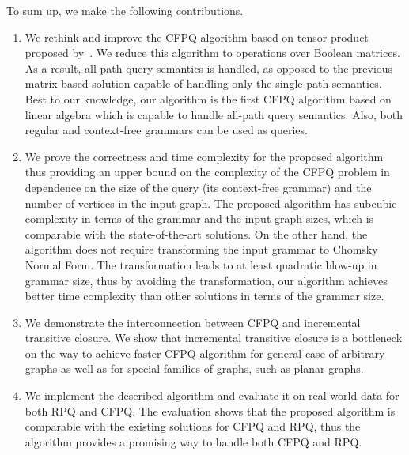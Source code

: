 To sum up, we make the following contributions.
\begin{enumerate}
	\item We rethink and improve the CFPQ algorithm based on tensor-product proposed by~\cite{10.1007/978-3-030-54832-2_6}.
	We reduce this algorithm to operations over Boolean matrices.
	As a result, all-path query semantics is handled, as opposed to the previous matrix-based solution capable of handling only the single-path semantics.
	Best to our knowledge, our algorithm is the first CFPQ algorithm based on linear algebra which is capable to handle all-path query semantics.
	Also, both regular and context-free grammars can be used as queries.
	\item
	We prove the correctness and time complexity for the proposed algorithm thus providing an upper bound on the complexity of the CFPQ problem in dependence on the size of the query (its context-free grammar) and the number of vertices in the input graph.
	The proposed algorithm has subcubic complexity in terms of the grammar and the input graph sizes, which is comparable with the state-of-the-art solutions.
	On the other hand, the algorithm does not require transforming the input grammar to Chomsky Normal Form.
	The transformation leads to at least quadratic blow-up in grammar size, thus by avoiding the transformation, our algorithm achieves better time complexity   than other solutions in terms of the grammar size.
	\item We demonstrate the interconnection between CFPQ and incremental transitive closure.
	We show that incremental transitive closure is a bottleneck on the way to achieve faster CFPQ algorithm for general case of arbitrary graphs as well as for special families of graphs, such as planar graphs.
	\item We implement the described algorithm and evaluate it on real-world data for both RPQ and CFPQ.
	The evaluation shows that the proposed algorithm is comparable with the existing solutions for CFPQ and RPQ, thus the algorithm provides a promising way to handle both CFPQ and RPQ.
\end{enumerate}
